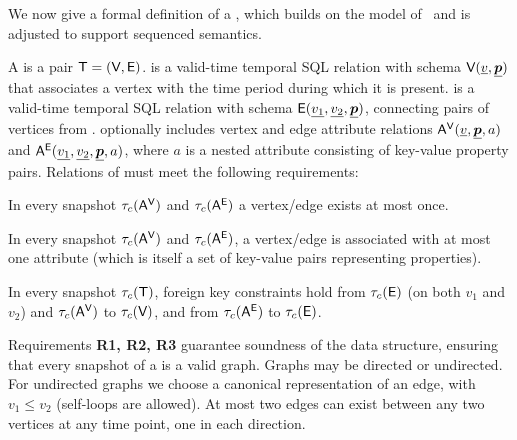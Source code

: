 We now give a formal definition of a \tg, which builds on the model
of~\cite{PortalarXiv2016} and is adjusted to support sequenced
semantics.

\begin{definition}[TGraph]
A \tg is a pair $\mathsf{T}=(\textsf{V}, \textsf{E})$. \tv is a valid-time temporal SQL
relation with schema $\textsf{V}(\underline{v}, \underline{\boldsymbol{p}})$ that
associates a vertex with the time period during which it is
present. \te is a valid-time temporal SQL relation with schema
$\textsf{E}(\underline{v_1}, \underline{v_2}, \underline{\boldsymbol{p}})$, connecting
pairs of vertices from \tv.  
%
\tve optionally includes vertex and edge attribute relations
$\mathsf{A^{V}}(\underline{v}, \underline{\boldsymbol{p}}, a)$ and $\mathsf{A^{E}}(\underline{v_1},
\underline{v_2}, \underline{\boldsymbol{p}}, a)$, where $a$ is a nested attribute
consisting of key-value property pairs.
%
Relations of \tve must meet the following requirements:

\begin{description}[noitemsep]
\item [R1: Unique vertices/edges] In every snapshot $\tau_c (\mathsf{A^{V}})$
  and $\tau_c (\mathsf{A^{E}})$ a vertex/edge exists at most once.
\item [R2: Unique attribute values] In every snapshot $\tau_c
  (\mathsf{A^{V}})$ and $\tau_c (\mathsf{A^{E}})$, a vertex/edge is associated with at
  most one attribute (which is itself a set of key-value pairs
  representing properties).
\item [R3: Referential integrity] In every snapshot $\tau_c (\mathsf{T})$,
  foreign key constraints hold from $\tau_c (\textsf{E})$ (on both $v_1$
  and $v_2$) and $\tau_c (\mathsf{A^{V}})$ to $\tau_c (\textsf{V})$, and from
  $\tau_c (\mathsf{A^{E}})$ to $\tau_c (\textsf{E})$.
\end{description}
\label{def:tg}
\vspace{-0.2cm}
\end{definition}

Requirements {\bf R1, R2, R3} guarantee soundness of the \tg data
structure, ensuring that every snapshot of a \tg is a valid
graph. Graphs may be directed or undirected.  For undirected graphs we
choose a canonical representation of an edge, with $v_1 \leq v_2$
(self-loops are allowed). At most
two edges can exist between any two vertices at any time point, one in
each direction.

